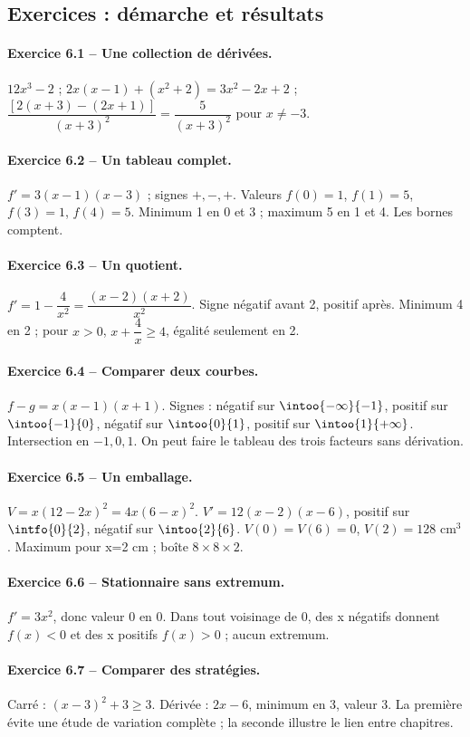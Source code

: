 \subsection*{Exercices : démarche et résultats}
\paragraph{Exercice 6.1 -- Une collection de dérivées.} $12x^3-2$ ; $2x(x-1)+(x^2+2)=3x^2-2x+2$ ; $\dfrac{[2(x+3)-(2x+1)]}{(x+3)^2}=\dfrac{5}{(x+3)^2}$ pour $x\ne-3$.
\paragraph{Exercice 6.2 -- Un tableau complet.} $f\prime=3(x-1)(x-3)$ ; signes $+,-,+$. Valeurs $f(0)=1$, $f(1)=5$, $f(3)=1$, $f(4)=5$. Minimum 1 en 0 et 3 ; maximum 5 en 1 et 4. Les bornes comptent.
\paragraph{Exercice 6.3 -- Un quotient.} $f\prime =1-\dfrac{4}{x^2}=\dfrac{(x-2)(x+2)}{x^2}$. Signe négatif avant 2, positif après. Minimum 4 en 2 ; pour $x>0$, $x+\dfrac{4}{x}\geq 4$, égalité seulement en 2.
\paragraph{Exercice 6.4 -- Comparer deux courbes.} $f-g=x(x-1)(x+1)$. Signes : négatif sur $\intoo{-\infty}{-1}$, positif sur $\intoo{-1}{0}$, négatif sur $\intoo{0}{1}$, positif sur $\intoo{1}{+\infty}$. Intersection en $-1,0,1$. On peut faire le tableau des trois facteurs sans dérivation.
\paragraph{Exercice 6.5 -- Un emballage.} $V=x(12-2x)^2=4x(6-x)^2$. $V\prime=12(x-2)(x-6)$, positif sur $\intfo{0}{2}$, négatif sur $\intoo{2}{6}$. $V(0)=V(6)=0$, $V(2)=128$ cm$^3$. Maximum pour x=2 cm ; boîte $8\times8\times2$.
\paragraph{Exercice 6.6 -- Stationnaire sans extremum.} $f\prime=3x^2$, donc valeur 0 en 0. Dans tout voisinage de 0, des x négatifs donnent $f(x)<0$ et des x positifs $f(x)>0$ ; aucun extremum.
\paragraph{Exercice 6.7 -- Comparer des stratégies.} Carré : $(x-3)^2+3\geq3$. Dérivée : $2x-6$, minimum en 3, valeur 3. La première évite une étude de variation complète ; la seconde illustre le lien entre chapitres.
